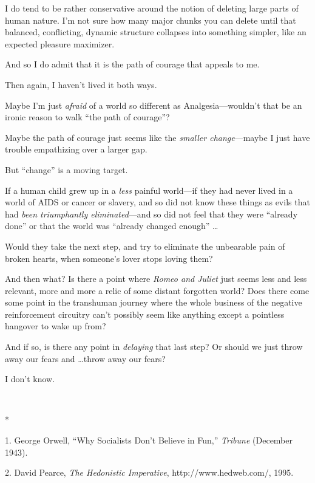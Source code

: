 {
 I do tend to be rather conservative around the notion of deleting
large parts of human nature. I'm not sure how many
major chunks you can delete until that balanced, conflicting, dynamic
structure collapses into something simpler, like an expected pleasure
maximizer.}

{
 And so I do admit that it is the path of courage that appeals to
me.}

{
 Then again, I haven't lived it both ways.}

{
 Maybe I'm just \textit{afraid} of a world so
different as Analgesia---wouldn't that be an ironic
reason to walk ``the path of
courage''?}

{
 Maybe the path of courage just seems like the \textit{smaller
change}{}---maybe I just have trouble empathizing over a larger gap.}

{
 But ``change'' is a moving
target.}

{
 If a human child grew up in a \textit{less} painful world---if
they had never lived in a world of AIDS or cancer or slavery, and so
did not know these things as evils that had \textit{been triumphantly
eliminated}{}---and so did not feel that they were
``already done'' or that the world
was ``already changed enough''
\ldots}

{
 Would they take the next step, and try to eliminate the unbearable
pain of broken hearts, when someone's lover stops
loving them?}

{
 And then what? Is there a point where \textit{Romeo and Juliet}
just seems less and less relevant, more and more a relic of some
distant forgotten world? Does there come some point in the transhuman
journey where the whole business of the negative reinforcement
circuitry can't possibly seem like anything except a
pointless hangover to wake up from?}

{
 And if so, is there any point in \textit{delaying} that last step?
Or should we just throw away our fears and \ldots throw away our fears?}

{
 I don't know.}

{\centering
 \ ~
\par}

{\centering
 *
\par}


\bigskip

{
 1. George Orwell, ``Why Socialists
Don't Believe in Fun,''
\textit{Tribune} (December 1943).}

{
 2. David Pearce, \textit{The Hedonistic Imperative},
http://www.hedweb.com/, 1995.}

